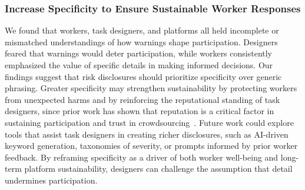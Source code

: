 \subsubsection{Increase Specificity to Ensure Sustainable Worker Responses}
We found that workers, task designers, and platforms all held incomplete or mismatched understandings of how warnings shape participation. Designers feared that warnings would deter participation, while workers consistently emphasized the value of specific details in making informed decisions. Our findings suggest that risk disclosures should prioritize specificity over generic phrasing. Greater specificity may strengthen sustainability by protecting workers from unexpected harms and by reinforcing the reputational standing of task designers, since prior work has shown that reputation is a critical factor in sustaining participation and trust in crowdsourcing~\cite{gaikwad2016boomerang, irani2013turkopticon}. Future work could explore tools that assist task designers in creating richer disclosures, such as AI-driven keyword generation, taxonomies of severity, or prompts informed by prior worker feedback. By reframing specificity as a driver of both worker well-being and long-term platform sustainability, designers can challenge the assumption that detail undermines participation. 

